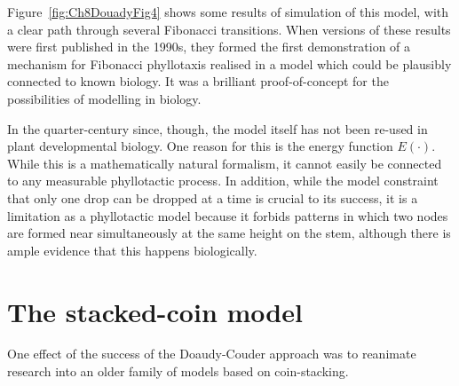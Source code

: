   Figure~\ref{fig:Ch8DouadyFig4} shows some results of simulation of this model, with a clear path through several Fibonacci transitions.  When versions of these  results were first published in the 1990s, they formed the first demonstration of a mechanism for Fibonacci phyllotaxis realised in a model which could be plausibly connected to known biology. It was a brilliant proof-of-concept for the possibilities of modelling in biology. 
  
  In the quarter-century since, though, the model itself has not been  re-used in plant developmental biology. One reason for this is the 
  energy function $E(\cdot)$. While this is a mathematically natural formalism, it cannot easily be connected to any measurable phyllotactic process. In addition, while the model constraint that only one drop can be dropped at a time is crucial to its success, it is a limitation as a phyllotactic model because it forbids patterns in which two nodes are formed near simultaneously at the same height on the stem, although there is ample evidence that this happens biologically. 
  
 






\clearpage

\section{The stacked-coin model}

One effect of the success of the Doaudy-Couder approach was to reanimate research into an older family of models based on coin-stacking.%

